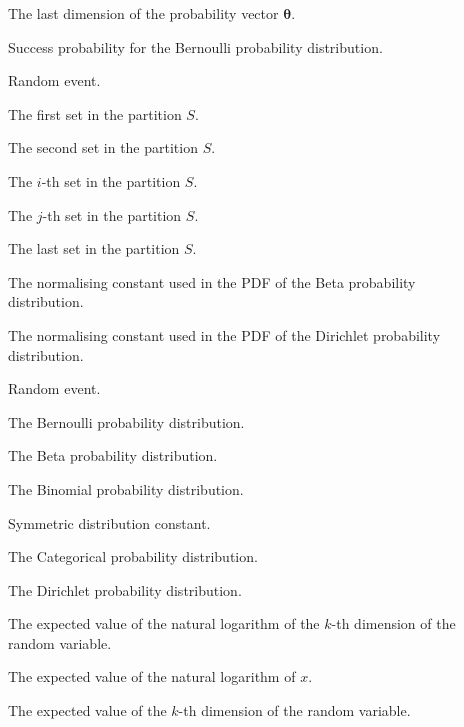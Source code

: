 \begin{description}
	\item [\parbox{2cm}{$\theta_{K}$}] \parbox{12.5cm}{The last dimension of the probability vector $\boldsymbol{\theta}$.}
	\item [\parbox{2cm}{$\theta$}] \parbox{12.5cm}{Success probability for the Bernoulli probability distribution.}
	\item [\parbox{2cm}{$A$}] \parbox{12.5cm}{Random event.}
	\item [\parbox{2cm}{$B_{1}$}] \parbox{12.5cm}{The first set in the partition $S$.}
	\item [\parbox{2cm}{$B_{2}$}] \parbox{12.5cm}{The second set in the partition $S$.}
	\item [\parbox{2cm}{$B_{i}$}] \parbox{12.5cm}{The $i$-th set in the partition $S$.}
	\item [\parbox{2cm}{$B_{j}$}] \parbox{12.5cm}{The $j$-th set in the partition $S$.}
	\item [\parbox{2cm}{$B_{K}$}] \parbox{12.5cm}{The last set in the partition $S$.}
	\item [\parbox{2cm}{$B(\alpha, \beta)$}] \parbox{12.5cm}{The normalising constant used in the \acs{PDF} of the Beta probability distribution.}
	\item [\parbox{2cm}{$B(\boldsymbol{\alpha})$}] \parbox{12.5cm}{The normalising constant used in the \acs{PDF} of the Dirichlet probability distribution.}
	\item [\parbox{2cm}{$B$}] \parbox{12.5cm}{Random event.}
	\item [\parbox{2cm}{$Ber$}] \parbox{12.5cm}{The Bernoulli probability distribution.}
	\item [\parbox{2cm}{$Beta$}] \parbox{12.5cm}{The Beta probability distribution.}
	\item [\parbox{2cm}{$Bin$}] \parbox{12.5cm}{The Binomial probability distribution.}
	\item [\parbox{2cm}{$c$}] \parbox{12.5cm}{Symmetric distribution constant.}
	\item [\parbox{2cm}{$Cat$}] \parbox{12.5cm}{The Categorical probability distribution.}
	\item [\parbox{2cm}{$Dir$}] \parbox{12.5cm}{The Dirichlet probability distribution.}
	\item [\parbox{2cm}{$E[\ln(x_{k})]$}] \parbox{12.5cm}{The expected value of the natural logarithm of the $k$-th dimension of the random variable.}
	\item [\parbox{2cm}{$E[\ln(x)]$}] \parbox{12.5cm}{The expected value of the natural logarithm of $x$.}
	\item [\parbox{2cm}{$E[x_{k}]$}] \parbox{12.5cm}{The expected value of the $k$-th dimension of the random variable.}

\end{description}
